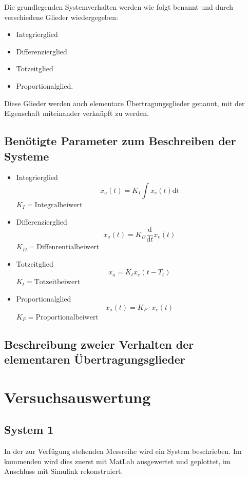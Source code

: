 \documentclass[12pt, oneside, a4paper]{scrreprt}
\newcommand{\dt}{\ensuremath{\mathrm{d}t}}
\begin{document}
Die grundlegenden Systemverhalten werden wie folgt benannt und durch verschiedene 
Glieder wiedergegeben:
\begin{center}
   \begin{itemize}
   \item Integrierglied
   \item Differenzierglied
   \item Totzeitglied
   \item Proportionalglied.
   \end{itemize}
\end{center}
Diese Glieder werden auch elementare Übertragungsglieder genannt, mit der 
Eigenschaft miteinander verknüpft zu werden. 


\section{Benötigte Parameter zum Beschreiben der Systeme}
\begin{itemize}
   \item Integrierglied
   \begin{equation}
      x_a(t)=K_I\int x_e(t)\dt
   \end{equation}
   $K_I=\text{Integralbeiwert}$
   \item Differenzierglied
   \begin{equation}
      x_a(t)=K_D\frac{\mathrm{d}}{\dt} x_e(t)
   \end{equation}
   $K_D=\text{Diffenrentialbeiwert}$
   \item Totzeitglied
   \begin{equation}
      x_a=K_tx_e(t-T_t)
   \end{equation}
   $K_t=\text{Totzeitbeiwert}$
   \item Proportionalglied
   \begin{equation}
      x_a(t)=K_P\cdot x_e(t)
   \end{equation}
   $K_P=\text{Proportionalbeiwert}$
\end{itemize}


\section{Beschreibung zweier Verhalten der elementaren Übertragungsglieder}

\chapter{Versuchsauswertung}
\section{System 1}
In der zur Verfügung stehenden Messreihe wird ein System beschrieben. Im 
kommenden wird dies zuerst mit MatLab ausgewertet und geplottet, im Anschluss 
mit Simulink rekonstruiert. 
\end{document}
